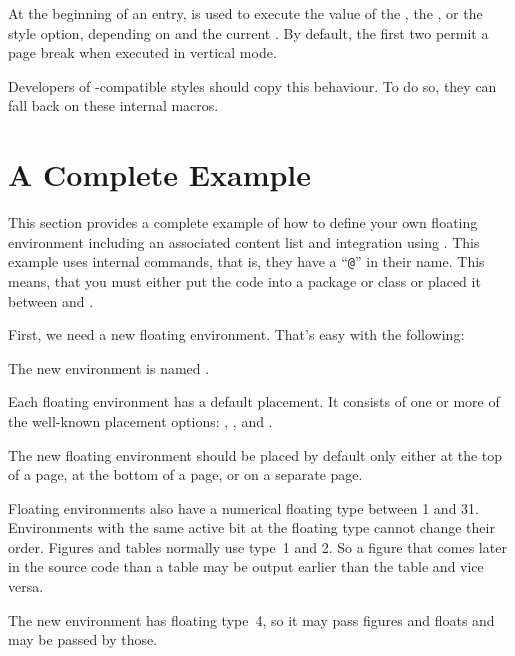 At the beginning of an entry,  is
used to execute the value of the , the
, or the  style option,
depending on  and the current . By
default, the first two permit a page break when executed in vertical mode.

Developers of -compatible styles should copy this behaviour.
To do so, they can fall back on these internal macros.%
\EndIndexGroup


\section{A Complete Example}

This section provides a complete example of how to define your own floating
environment including an associated content list and \KOMAScript{} integration
using . This example uses internal commands, that is, they
have a ``\texttt{@}'' in their name. This means, that you
must either put the code into a package or class or placed it between
%
 and .

First, we need a new floating environment.
That's easy with the following:
\begin{lstcode}
  \newenvironment{remarkbox}{%
    \@float{remarkbox}%
  }{%
    \end@float
  }
\end{lstcode}
The new environment is named .

Each floating environment has a default placement. It
consists of one or more of the well-known placement options: ,
 ,  and .
\begin{lstcode}
  \newcommand*{\fps@remarkbox}{tbp}
\end{lstcode}
The new floating environment should be placed by default only either at
the top of a page, at the bottom of a page, or on a separate page.

Floating environments also have a numerical floating
type between 1 and 31. Environments with the same active bit at the floating type cannot change
their order. Figures and tables normally use type~1 and 2. So a figure that
comes later in the source code than a table may be output earlier than the
table and vice versa.
\begin{lstcode}
  \newcommand*{\ftype@remarkbox}{4}
\end{lstcode}
The new environment has floating type~4, so it may pass figures and floats and
may be passed by those.

